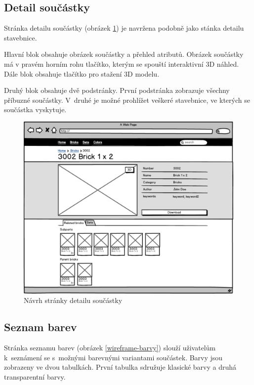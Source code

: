 \subsection{Detail součástky}
Stránka detailu součástky (obrázek \ref{wireframe-soucastka-detail}) je navržena podobně jako stánka detailu stavebnice. 

Hlavní blok obsahuje obrázek součástky a přehled atributů. Obrázek součástky má v pravém horním rohu tlačítko, kterým se spouští interaktivní 3D náhled. Dále blok obsahuje tlačítko pro stažení 3D modelu. 

Druhý blok obsahuje dvě podstránky. První podstránka zobrazuje všechny příbuzné součástky. V~druhé je možné prohlížet veškeré stavebnice, ve kterých se součástka vyskytuje.

\begin{figure}[htbp]
    \centering
    \includegraphics[width=\textwidth,height=\textheight,keepaspectratio]{pdfs/wireframe_brick.pdf}
    \caption{Návrh stránky detailu součástky}\label{wireframe-soucastka-detail}
\end{figure}

\subsection{Seznam barev}
Stránka seznamu barev (obrázek \ref{wireframe-barvy}) slouží uživatelům k~seznámení se s~možnými barevnými variantami součástek. Barvy jsou zobrazeny ve dvou tabulkách. První tabulka sdružuje klasické barvy a druhá transparentní barvy. 

